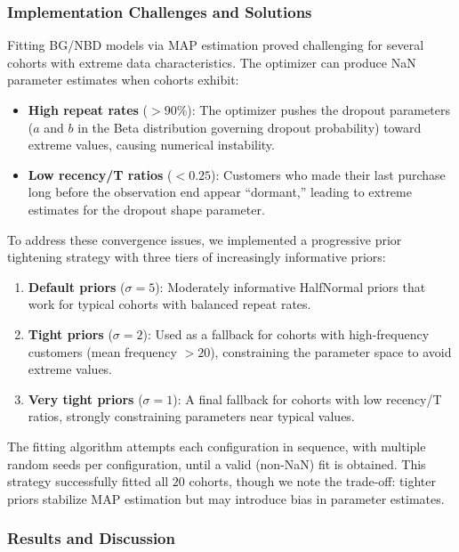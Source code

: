 \documentclass[11pt]{amsart}
\theoremstyle{definition}
\begin{document}
\subsubsection{Implementation Challenges and Solutions}

Fitting BG/NBD models via MAP estimation proved challenging for several cohorts with extreme data characteristics.
The optimizer can produce NaN parameter estimates when cohorts exhibit:

\begin{itemize}
    \item \textbf{High repeat rates} ($>90\%$): The optimizer pushes the dropout parameters ($a$ and $b$ in the
          Beta distribution governing dropout probability) toward extreme values, causing numerical instability.
    \item \textbf{Low recency/T ratios} ($<0.25$): Customers who made their last purchase long before the
          observation end appear ``dormant,'' leading to extreme estimates for the dropout shape parameter.
\end{itemize}

To address these convergence issues, we implemented a progressive prior tightening strategy with three tiers
of increasingly informative priors:

\begin{enumerate}
    \item \textbf{Default priors} ($\sigma = 5$): Moderately informative HalfNormal priors that work for
          typical cohorts with balanced repeat rates.
    \item \textbf{Tight priors} ($\sigma = 2$): Used as a fallback for cohorts with high-frequency customers
          (mean frequency $> 20$), constraining the parameter space to avoid extreme values.
    \item \textbf{Very tight priors} ($\sigma = 1$): A final fallback for cohorts with low recency/T ratios,
          strongly constraining parameters near typical values.
\end{enumerate}

The fitting algorithm attempts each configuration in sequence, with multiple random seeds per configuration,
until a valid (non-NaN) fit is obtained. This strategy successfully fitted all $20$ cohorts, though we note
the trade-off: tighter priors stabilize MAP estimation but may introduce bias in parameter estimates.

\subsubsection{Results and Discussion}
\end{document}
